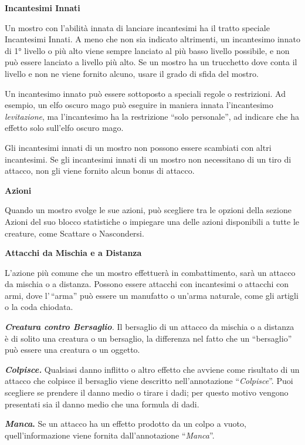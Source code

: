 \begin{multicols}{2}
\textbf{Incantesimi Innati}

Un mostro con l'abilità innata di lanciare incantesimi ha il tratto
speciale Incantesimi Innati. A meno che non sia indicato altrimenti, un
incantesimo innato di 1° livello o più alto viene sempre lanciato al più
basso livello possibile, e non può essere lanciato a livello più alto.
Se un mostro ha un trucchetto dove conta il livello e non ne viene
fornito alcuno, usare il grado di sfida del mostro.

Un incantesimo innato può essere sottoposto a speciali regole o
restrizioni. Ad esempio, un elfo oscuro mago può eseguire in maniera
innata l'incantesimo \emph{levitazione}, ma l'incantesimo ha la
restrizione ``solo personale'', ad indicare che ha effetto solo
sull'elfo oscuro mago.

Gli incantesimi innati di un mostro non possono essere scambiati con
altri incantesimi. Se gli incantesimi innati di un mostro non
necessitano di un tiro di attacco, non gli viene fornito alcun bonus di
attacco.

\textbf{Azioni}

Quando un mostro svolge le sue azioni, può scegliere tra le opzioni
della sezione Azioni del suo blocco statistiche o impiegare una delle
azioni disponibili a tutte le creature, come Scattare o Nascondersi.

\textbf{Attacchi da Mischia e a Distanza}

L'azione più comune che un mostro effettuerà in combattimento, sarà un
attacco da mischia o a distanza. Possono essere attacchi con incantesimi
o attacchi con armi, dove l'\,``arma'' può essere un manufatto o un'arma
naturale, come gli artigli o la coda chiodata.

\emph{\textbf{Creatura contro Bersaglio}.} Il bersaglio di un attacco da
mischia o a distanza è di solito una creatura o un bersaglio, la
differenza nel fatto che un ``bersaglio'' può essere una creatura o un
oggetto.

\emph{\textbf{Colpisce.}} Qualsiasi danno inflitto o altro effetto che
avviene come risultato di un attacco che colpisce il bersaglio viene
descritto nell'annotazione ``\emph{Colpisce}''. Puoi scegliere se
prendere il danno medio o tirare i dadi; per questo motivo vengono
presentati sia il danno medio che una formula di dadi.

\textbf{\emph{Manca}.} Se un attacco ha un effetto prodotto da un colpo
a vuoto, quell'informazione viene fornita dall'annotazione
``\emph{Manca}''.


\end{multicols}
